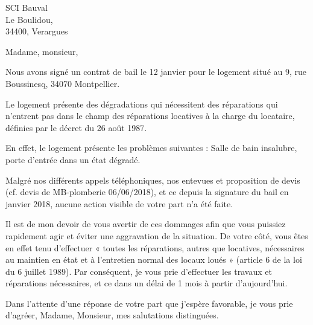 \documentclass[11pt]{lettre}
\begin{document}
	\begin{letter}{SCI Bauval\\ Le Boulidou,\\ 34400, Verargues}
		\signature{Cédric \textsc{Jourdain}, Cora \textsc{Perroud}, Marianne \textsc{Vidal}, Sylvain\textsc{Perico}}
		\address{9, rue boussinesq}
		\opening{Madame, monsieur,}
		Nous  avons signé un contrat de bail le 12 janvier pour le logement situé au 9, rue Boussinesq, 34070 Montpellier.

		Le logement présente des dégradations qui nécessitent des réparations qui n'entrent pas dans le champ des réparations locatives à la charge du locataire, définies par le décret du 26 août 1987.
		
		En effet, le logement présente les problèmes suivantes : Salle de bain insalubre, porte d'entrée dans un état dégradé.
		
		Malgré nos différents appels téléphoniques, nos entevues et proposition de devis (cf. devis de MB-plomberie 06/06/2018), et ce depuis la signature du bail en janvier 2018, aucune action visible de votre part n'a été faite. 

		Il est de mon devoir de vous avertir de ces dommages afin que vous puissiez rapidement agir et éviter une aggravation de la situation. De votre côté, vous êtes en effet tenu d’effectuer « toutes les réparations, autres que locatives, nécessaires au maintien en état et à l’entretien normal des locaux loués » (article 6 de la loi du 6 juillet 1989). Par conséquent, je vous prie d'effectuer les travaux et réparations nécessaires, et ce dans un délai de 1 mois à partir d'aujourd'hui. 

 		\closing{Dans l’attente d’une réponse de votre part que j’espère favorable, je vous prie d'agréer, Madame, Monsieur, mes salutations distinguées.}
 
	\end{letter}
\end{document}
